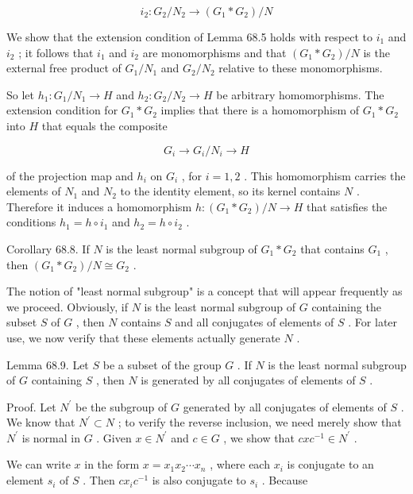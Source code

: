 \[
{i}_{2} : {G}_{2}/{N}_{2} \rightarrow  \left( {{G}_{1} * {G}_{2}}\right) /N
\]

We show that the extension condition of Lemma 68.5 holds with respect to \({i}_{1}\) and \({i}_{2}\) ; it follows that \({i}_{1}\) and \({i}_{2}\) are monomorphisms and that \(\left( {{G}_{1} * {G}_{2}}\right) /N\) is the external free product of \({G}_{1}/{N}_{1}\) and \({G}_{2}/{N}_{2}\) relative to these monomorphisms.

So let \({h}_{1} : {G}_{1}/{N}_{1} \rightarrow  H\) and \({h}_{2} : {G}_{2}/{N}_{2} \rightarrow  H\) be arbitrary homomorphisms. The extension condition for \({G}_{1} * {G}_{2}\) implies that there is a homomorphism of \({G}_{1} * {G}_{2}\) into \(H\) that equals the composite

\[
{G}_{i} \rightarrow  {G}_{i}/{N}_{i} \rightarrow  H
\]

of the projection map and \({h}_{i}\) on \({G}_{i}\) , for \(i = 1,2\) . This homomorphism carries the elements of \({N}_{1}\) and \({N}_{2}\) to the identity element, so its kernel contains \(N\) . Therefore it induces a homomorphism \(h : \left( {{G}_{1} * {G}_{2}}\right) /N \rightarrow  H\) that satisfies the conditions \({h}_{1} = h \circ  {i}_{1}\) and \({h}_{2} = h \circ  {i}_{2}\) .

Corollary 68.8. If \(N\) is the least normal subgroup of \({G}_{1} * {G}_{2}\) that contains \({G}_{1}\) , then \(\left( {{G}_{1} * {G}_{2}}\right) /N \cong  {G}_{2}\) .

The notion of "least normal subgroup" is a concept that will appear frequently as we proceed. Obviously, if \(N\) is the least normal subgroup of \(G\) containing the subset \(S\) of \(G\) , then \(N\) contains \(S\) and all conjugates of elements of \(S\) . For later use, we now verify that these elements actually generate \(N\) .

Lemma 68.9. Let \(S\) be a subset of the group \(G\) . If \(N\) is the least normal subgroup of \(G\) containing \(S\) , then \(N\) is generated by all conjugates of elements of \(S\) .

Proof. Let \({N}^{\prime }\) be the subgroup of \(G\) generated by all conjugates of elements of \(S\) . We know that \({N}^{\prime } \subset  N\) ; to verify the reverse inclusion, we need merely show that \({N}^{\prime }\) is normal in \(G\) . Given \(x \in  {N}^{\prime }\) and \(c \in  G\) , we show that \({cx}{c}^{-1} \in  {N}^{\prime }\) .

We can write \(x\) in the form \(x = {x}_{1}{x}_{2}\cdots {x}_{n}\) , where each \({x}_{i}\) is conjugate to an element \({s}_{i}\) of \(S\) . Then \(c{x}_{i}{c}^{-1}\) is also conjugate to \({s}_{i}\) . Because


